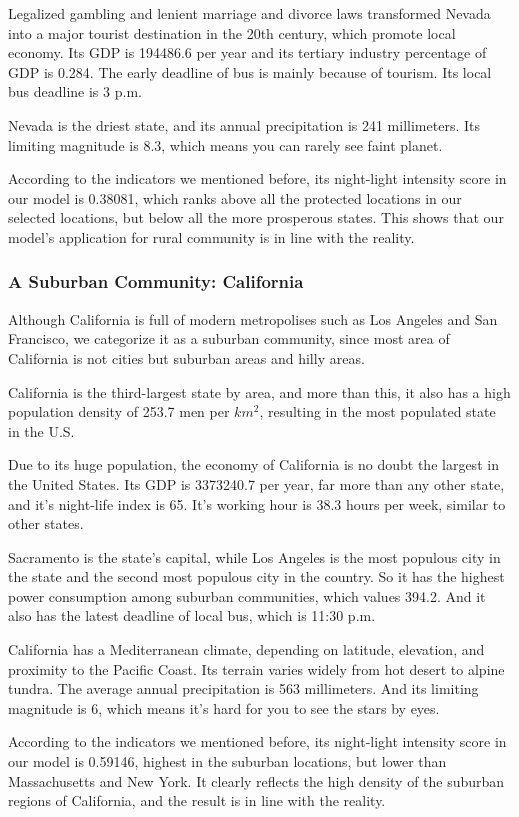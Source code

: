Legalized gambling and lenient marriage and divorce laws transformed Nevada into a major tourist destination in the 20th century, which promote local economy. Its GDP is 194486.6 per year and its tertiary industry percentage of GDP is 0.284. The early deadline of bus is mainly because of tourism. Its local bus deadline is 3 p.m.

Nevada is the driest state, and its annual precipitation is 241 millimeters. Its limiting magnitude is 8.3, which means you can rarely see faint planet.

According to the indicators we mentioned before, its night-light intensity score in our model is 0.38081, which ranks above all the protected locations in our selected locations, but below all the more prosperous states. This shows that our model's application for rural community is in line with the reality.

\subsubsection{A Suburban Community: California}
Although California is full of modern metropolises such as Los Angeles and San Francisco, we categorize it as a suburban community, since most area of California is not cities but suburban areas and hilly areas.

California is the third-largest state by area, and more than this, it also has a high population density of 253.7 men per $km^2$, resulting in the most populated state in the U.S.

Due to its huge population, the economy of California is no doubt the largest in the United States. Its GDP is 3373240.7 per year, far more than any other state, and it's night-life index is 65. It's working hour is 38.3 hours per week, similar to other states.

Sacramento is the state's capital, while Los Angeles is the most populous city in the state and the second most populous city in the country. So it has the highest power consumption among suburban communities, which values 394.2. And it also has the latest deadline of local bus, which is 11:30 p.m.

California has a Mediterranean climate, depending on latitude, elevation, and proximity to the Pacific Coast. Its terrain varies widely from hot desert to alpine tundra. The average annual precipitation is 563 millimeters. And its limiting magnitude is 6, which means it's hard for you to see the stars by eyes.

According to the indicators we mentioned before, its night-light intensity score in our model is 0.59146, highest in the suburban locations, but lower than Massachusetts and New York. It clearly reflects the high density of the suburban regions of California, and the result is in line with the reality.

